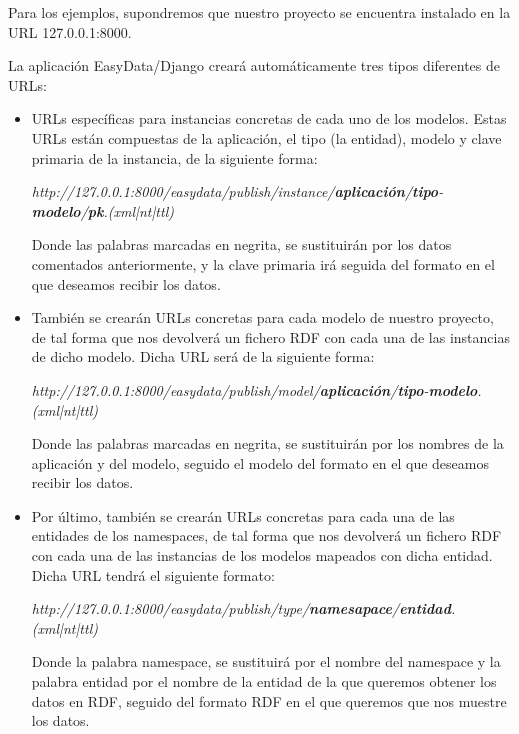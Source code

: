 Para los ejemplos, supondremos que nuestro proyecto se encuentra instalado en la
URL 127.0.0.1:8000.

La aplicación EasyData/Django creará automáticamente tres tipos diferentes de
URLs:
\begin{itemize}
    \item URLs específicas para instancias concretas de cada uno de los modelos.
        Estas URLs están compuestas de la aplicación, el tipo (la entidad),
        modelo y clave primaria de la instancia, de la siguiente forma:
    \begin{center}
        \textit{http://127.0.0.1:8000/easydata/publish/instance/\textbf{aplicación}/\textbf{tipo}-\textbf{modelo}/\textbf{pk}.(xml|nt|ttl)}
    \end{center}
        Donde las palabras marcadas en negrita, se sustituirán por los datos
        comentados anteriormente, y la clave primaria irá seguida del formato en
        el que deseamos recibir los datos.
    \item También se crearán URLs concretas para cada modelo de nuestro
        proyecto, de tal forma que nos devolverá un fichero RDF con cada una de
        las instancias de dicho modelo. Dicha URL será de la siguiente forma:
    \begin{center}
        \textit{http://127.0.0.1:8000/easydata/publish/model/\textbf{aplicación}/\textbf{tipo}-\textbf{modelo}.(xml|nt|ttl)}
    \end{center}
        Donde las palabras marcadas en negrita, se sustituirán por los nombres
        de la aplicación y del modelo, seguido el modelo del formato en el que
        deseamos recibir los datos.
    \item Por último, también se crearán URLs concretas para cada una de las
        entidades de los namespaces, de tal forma que nos devolverá un fichero
        RDF con cada una de las instancias de los modelos mapeados con dicha
        entidad. Dicha URL tendrá el siguiente formato:
    \begin{center}
        \textit{http://127.0.0.1:8000/easydata/publish/type/\textbf{namesapace}/\textbf{entidad}.(xml|nt|ttl)}
    \end{center}
        Donde la palabra namespace, se sustituirá por el nombre del namespace y
        la palabra entidad por el nombre de la entidad de la que queremos
        obtener los datos en RDF, seguido del formato RDF en el que queremos que
        nos muestre los datos.
\end{itemize}

